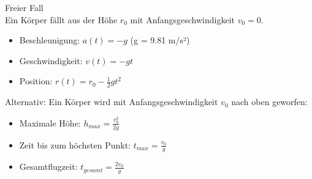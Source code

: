 \begin{example2}{Freier Fall}\\
    Ein Körper fällt aus der Höhe $r_0$ mit Anfangsgeschwindigkeit $v_0 = 0$.
    
    \begin{itemize}
        \item Beschleunigung: $a(t) = -g$ (g = 9.81 m/s²)
        \item Geschwindigkeit: $v(t) = -gt$
        \item Position: $r(t) = r_0 - \frac{1}{2}gt^2$
    \end{itemize}
    
    Alternativ: Ein Körper wird mit Anfangsgeschwindigkeit $v_0$ nach oben geworfen:
    \begin{itemize}
        \item Maximale Höhe: $h_{max} = \frac{v_0^2}{2g}$ 
        \item Zeit bis zum höchsten Punkt: $t_{max} = \frac{v_0}{g}$
        \item Gesamtflugzeit: $t_{gesamt} = \frac{2v_0}{g}$
    \end{itemize}
\end{example2}